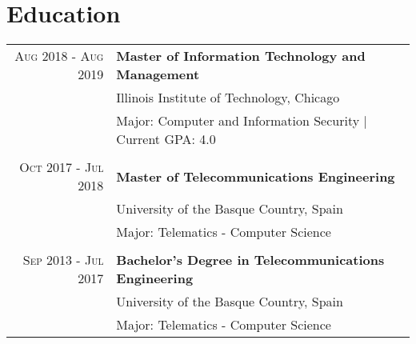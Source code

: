 \documentclass[a4paper,10pt]{article}
\begin{document}
\section{Education}
\begin{tabular}{rp{13.6cm}}

 \textsc{Aug 2018 - Aug 2019}& \textbf{Master of Information Technology and Management}\\
 & \footnotesize{Illinois Institute of Technology, Chicago} \\
 & Major: Computer and Information Security | Current GPA: 4.0 \\ &\\

 \textsc{Oct 2017 - Jul 2018}& \textbf{Master of Telecommunications Engineering}\\
 & \footnotesize{University of the Basque Country, Spain} \\
 & Major: Telematics - Computer Science \\&\\
 
 \textsc{Sep 2013 - Jul 2017}& \textbf{Bachelor's Degree in Telecommunications Engineering}\\
 & \footnotesize{University of the Basque Country, Spain} \\
 & Major: Telematics - Computer Science 


\end{tabular}
\vspace{-.3in}


\end{document}
